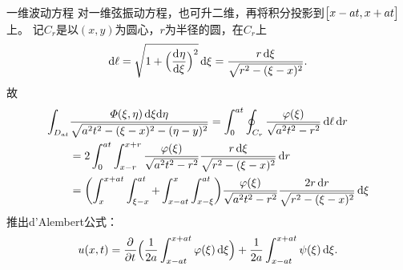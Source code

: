 \begin{example}{一维波动方程}{}
	对一维弦振动方程，也可升二维，再将积分投影到$\bigl[x - at,x + at\bigr]$上。
	记$C_r$是以$(x,y)$为圆心，$r$为半径的圆，在$C_r$上
	\begin{gather*}
		\mathop{}\!\mathrm{d}\ell = \sqrt{1 + \Bigl(\frac{\mathop{}\!\mathrm{d}^{}\eta}{\mathrm{d}{\xi}^{}}\Bigr)^2}\mathop{}\!\mathrm{d}\xi = \frac{r\mathop{}\!\mathrm{d}\xi}{\sqrt{r^2 - (\xi - x)^2}}.
	\end{gather*}
	故
	\begin{align*}
		\int_{D_{at}}&\frac{\varPhi(\xi,\eta)\d\xi\nd\eta}{\sqrt{a^2t^2 - (\xi - x)^2 - (\eta - y)^2}} = \int_0^{at}\oint_{C_r}\frac{\varphi(\xi)}{\sqrt{a^2t^2 - r^2}}\d\ell\d r\\
		&= 2\int_0^{at}\int_{x-r}^{x+r}\frac{\varphi(\xi)}{\sqrt{a^2t^2 - r^2}}\frac{r\d\xi}{\sqrt{r^2 - (\xi - x)^2}}\d r\\%
		&= \biggp{\int_x^{x+at}\int_{\xi-x}^{at} + \int_{x-at}^x\int_{x-\xi}^{at}}\frac{\varphi(\xi)}{\sqrt{a^2t^2 - r^2}}\frac{2r\d r}{\sqrt{r^2 - (\xi - x)^2}}\d\xi
	\end{align*}
	推出d'Alembert公式：
	\[
		u(x,t) = \frac{\partial^{}}{\partial{t}^{}}\Bigl(\frac1{2a}\int_{x-at}^{x+at}\varphi(\xi)\mathop{}\!\mathrm{d}\xi\Bigr) + \frac1{2a}\int_{x-at}^{x+at}\psi(\xi)\mathop{}\!\mathrm{d}\xi.
	\]
\end{example}
